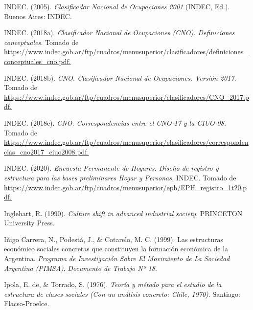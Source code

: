 \documentclass[
]{article}
\newlength{\cslhangindent}
\newlength{\cslentryspacingunit} %
\newenvironment{CSLReferences}[2] %
 {%
  \setlength{\parindent}{0pt}
  \ifodd #1
  \let\oldpar\par
  \def\par{\hangindent=\cslhangindent\oldpar}
  \fi
  \setlength{\parskip}{#2\cslentryspacingunit}
 }%
 {}
\begin{document}
\begin{CSLReferences}{1}{0}
\leavevmode{}%
INDEC. (2005). \emph{Clasificador {Nacional} de {Ocupaciones} 2001} (INDEC, Ed.). Buenos Aires: INDEC.

\leavevmode{}%
INDEC. (2018a). \emph{Clasificador {Nacional} de {Ocupaciones} ({CNO}). {Definiciones} conceptuales.} Tomado de \href{https://www.indec.gob.ar/ftp/cuadros/menusuperior/clasificadores/definiciones_conceptuales_cno.pdf}{https://www.indec.gob.ar/ftp/cuadros/menusuperior/clasificadores/definiciones\_conceptuales\_cno.pdf.}

\leavevmode{}%
INDEC. (2018b). \emph{{CNO}. {Clasificador} {Nacional} de {Ocupaciones}. {Versión} 2017}. Tomado de \href{https://www.indec.gob.ar/ftp/cuadros/menusuperior/clasificadores/CNO_2017.pdf}{https://www.indec.gob.ar/ftp/cuadros/menusuperior/clasificadores/CNO\_2017.pdf.}

\leavevmode{}%
INDEC. (2018c). \emph{{CNO}. {Correspondencias} entre el {CNO}-17 y la {CIUO}-08.} Tomado de \href{https://www.indec.gob.ar/ftp/cuadros/menusuperior/clasificadores/correspondencias_cno2017_ciuo2008.pdf}{https://www.indec.gob.ar/ftp/cuadros/menusuperior/clasificadores/correspondencias\_cno2017\_ciuo2008.pdf.}

\leavevmode{}%
INDEC. (2020). \emph{Encuesta {Permanente} de {Hogares}. {Diseño} de registro y estructura para las bases preliminares {Hogar} y {Personas}.} INDEC. Tomado de \href{https://www.indec.gob.ar/ftp/cuadros/menusuperior/eph/EPH_registro_1t20.pdf}{https://www.indec.gob.ar/ftp/cuadros/menusuperior/eph/EPH\_registro\_1t20.pdf.}

\leavevmode{}%
Inglehart, R. (1990). \emph{Culture shift in advanced industrial society}. PRINCETON University Press.

\leavevmode{}%
Iñigo Carrera, N., Podestá, J., \& Cotarelo, M. C. (1999). Las estructuras económico sociales concretas que constituyen la formación económica de la {Argentina}. \emph{Programa de Investigación Sobre El Movimiento de La Sociedad Argentina (PIMSA)}, \emph{Documento de Trabajo Nº 18}.

\leavevmode{}%
Ipola, E. de, \& Torrado, S. (1976). \emph{Teoría y método para el estudio de la estructura de clases sociales ({Con} un análisis concreto: {Chile}, 1970)}. Santiago: Flacso-Proelce.


\end{CSLReferences}
\end{document}

